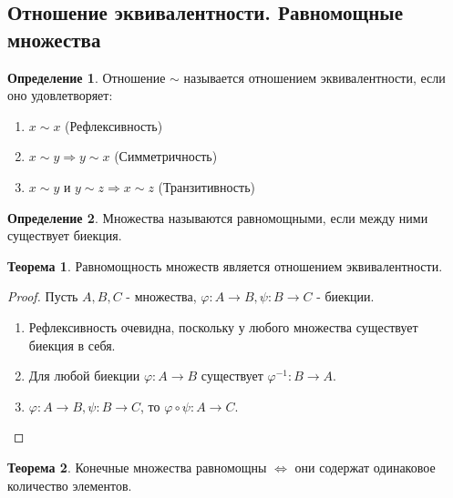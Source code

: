\documentclass[a4paper, 12pt]{article}
\renewcommand{\phi}{\varphi}
\newcommand{\lra}{\Leftrightarrow}
\theoremstyle{definition}
\newtheorem*{definition}{Определение}
\newtheorem*{theorem}{Теорема}
\begin{document}
        \subsection{Отношение эквивалентности. Равномощные множества}
        \begin{definition}
            Отношение $\sim$ называется отношением эквивалентности, если оно удовлетворяет:
            \begin{enumerate}
                \item $x\sim x$ (Рефлексивность)
                \item $x\sim y \Rightarrow y\sim x$ (Симметричность)
                \item $x\sim y$ и $y\sim z\Rightarrow x\sim z$ (Транзитивность)
            \end{enumerate}
        \end{definition} 
        \begin{definition}
            Множества называются равномощными, если между ними существует биекция.
        \end{definition}
        \begin{theorem}
            Равномощность множеств является отношением эквивалентности.
        \end{theorem}
        \begin{proof} Пусть $A,B,C$ - множества, $\phi:A\to B, \psi:B\to C$ - биекции.
            \begin{enumerate}
                \item Рефлексивность очевидна, поскольку у любого множества существует биекция в себя.
                \item Для любой биекции $\phi:A\to B$ существует $\phi^{-1}:B\to A$.
                \item $\phi:A\to B, \psi:B\to C$, то $\phi \circ \psi: A\to C$.
            \end{enumerate}
        \end{proof} 
        \begin{theorem}
            Конечные множества равномощны $\lra$ они содержат одинаковое количество элементов.
        \end{theorem}
\end{document}
